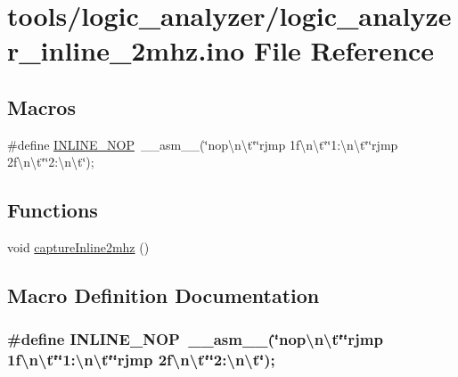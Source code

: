 \hypertarget{logic__analyzer__inline__2mhz_8ino}{\section{tools/logic\-\_\-analyzer/logic\-\_\-analyzer\-\_\-inline\-\_\-2mhz.ino File Reference}
\label{logic__analyzer__inline__2mhz_8ino}
}
\subsection*{Macros}
\begin{DoxyCompactItemize}
\item 
\#define \hyperlink{logic__analyzer__inline__2mhz_8ino_a74bd53df34dc120803c8536d944b8d46}{I\-N\-L\-I\-N\-E\-\_\-\-N\-O\-P}~\-\_\-\-\_\-asm\-\_\-\-\_\-(\char`\"{}nop\textbackslash{}n\textbackslash{}t\char`\"{}\char`\"{}rjmp 1f\textbackslash{}n\textbackslash{}t\char`\"{}\char`\"{}1\-:\textbackslash{}n\textbackslash{}t\char`\"{}\char`\"{}rjmp 2f\textbackslash{}n\textbackslash{}t\char`\"{}\char`\"{}2\-:\textbackslash{}n\textbackslash{}t\char`\"{});
\end{DoxyCompactItemize}
\subsection*{Functions}
\begin{DoxyCompactItemize}
\item 
void \hyperlink{logic__analyzer__inline__2mhz_8ino_a084ec7ee9102ae3bdba46df5e0e52ffd}{capture\-Inline2mhz} ()
\end{DoxyCompactItemize}


\subsection{Macro Definition Documentation}
\hypertarget{logic__analyzer__inline__2mhz_8ino_a74bd53df34dc120803c8536d944b8d46}{
\subsubsection[{I\-N\-L\-I\-N\-E\-\_\-\-N\-O\-P}]{\setlength{\rightskip}{0pt plus 5cm}\#define I\-N\-L\-I\-N\-E\-\_\-\-N\-O\-P~\-\_\-\-\_\-asm\-\_\-\-\_\-(\char`\"{}nop\textbackslash{}n\textbackslash{}t\char`\"{}\char`\"{}rjmp 1f\textbackslash{}n\textbackslash{}t\char`\"{}\char`\"{}1\-:\textbackslash{}n\textbackslash{}t\char`\"{}\char`\"{}rjmp 2f\textbackslash{}n\textbackslash{}t\char`\"{}\char`\"{}2\-:\textbackslash{}n\textbackslash{}t\char`\"{});}}\label{logic__analyzer__inline__2mhz_8ino_a74bd53df34dc120803c8536d944b8d46}


